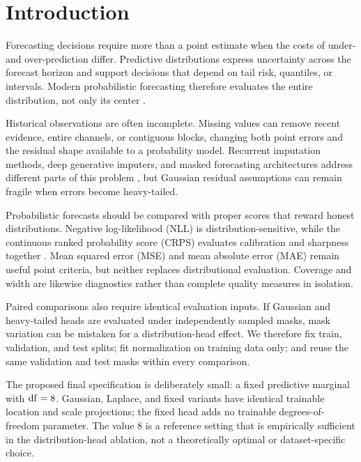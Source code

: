 \section{Introduction}
\label{sec:introduction}

Forecasting decisions require more than a point estimate when the costs of under- and over-prediction differ. Predictive distributions express uncertainty across the forecast horizon and support decisions that depend on tail risk, quantiles, or intervals. Modern probabilistic forecasting therefore evaluates the entire distribution, not only its center \citep{gneiting2007proper,gneiting2014probabilistic,salinas2020deepar}.

Historical observations are often incomplete. Missing values can remove recent evidence, entire channels, or contiguous blocks, changing both point errors and the residual shape available to a probability model. Recurrent imputation methods, deep generative imputers, and masked forecasting architectures address different parts of this problem \citep{cao2018brits,che2018grud,fortuin2020gpvae,tashiro2021csdi,du2023saits,lee2025timeperceiver}, but Gaussian residual assumptions can remain fragile when errors become heavy-tailed.

Probabilistic forecasts should be compared with proper scores that reward honest distributions. Negative log-likelihood (NLL) is distribution-sensitive, while the continuous ranked probability score (CRPS) evaluates calibration and sharpness together \citep{matheson1976crps,gneiting2007proper,jordan2019scoringrules}. Mean squared error (MSE) and mean absolute error (MAE) remain useful point criteria, but neither replaces distributional evaluation. Coverage and width are likewise diagnostics rather than complete quality measures in isolation.

Paired comparisons also require identical evaluation inputs. If Gaussian and heavy-tailed heads are evaluated under independently sampled masks, mask variation can be mistaken for a distribution-head effect. We therefore fix train, validation, and test splits; fit normalization on training data only; and reuse the same validation and test masks within every comparison.

The proposed final specification is deliberately small: a fixed \StudentT{} predictive marginal with $\mathrm{df}=8$. Gaussian, Laplace, and fixed \StudentT{} variants have identical trainable location and scale projections; the fixed head adds no trainable degrees-of-freedom parameter. The value $8$ is a reference setting that is empirically sufficient in the distribution-head ablation, not a theoretically optimal or dataset-specific choice.

